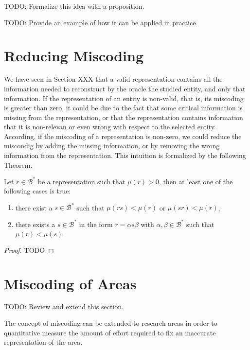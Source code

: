 {\color{red} TODO: Formalize this idea with a proposition.}

{\color{red} TODO: Provide an example of how it can be applied in practice.}


%
%
\section{Reducing Miscoding}

We have seen in Section {\color{red} XXX} that a valid representation contains all the information needed to reconstruct by the oracle the studied entity, and only that information. If the representation of an entity is non-valid, that is, its miscoding is greater than zero, it could be due to the fact that some critical information is missing from the representation, or that the representation contains information that it is non-relevan or even wrong with respect to the selected entity. According, if the miscoding of a representation is non-zero, we could reduce the miscondig by adding the missing information, or by removing the wrong information from the representation. This intuition is formalized by the following Theorem.

\begin{theorem}
Let $r \in \mathcal{B}^\ast$ be a representation such that $\mu(r) >0$, then at least one of the following cases is true:
\begin{enumerate}[label=(\roman*)]
\item there exist a $s \in \mathcal{B}^\ast$ such that $\mu(rs) < \mu(r)$ or $\mu(sr) < \mu(r)$,
\item there exists a $s \in \mathcal{B}^\ast$ in the form $r = \alpha s \beta$ with $\alpha, \beta \in \mathcal{B}^\ast$ such that $\mu(r) < \mu(s)$.
\end{enumerate}
\end{theorem}
\begin{proof}
{\color{red} TODO}
\end{proof}

%
%
\section{Miscoding of Areas}

{\color{red} TODO: Review and extend this section.}

The concept of miscoding can be extended to research areas in order to quantitative measure the amount of effort required to fix an inaccurate representation of the area.

